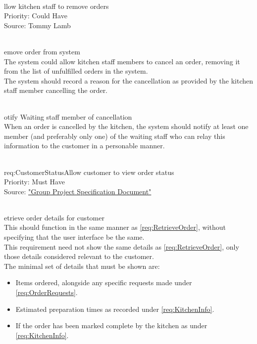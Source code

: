 \documentclass[11pt, a4paper]{report}
\def\itempar#1\\{\item \textbf{#1}\\} %
\begin{document}
\begin{enumerate}[label=F-UR-\arabic*, series=functional]
\begin{enumerate}[label*=.\arabic*]
\end{enumerate}

\itempar Allow kitchen staff to remove orders\\
Priority: Could Have\\
Source: Tommy Lamb\\
\begin{enumerate}[label*=.\arabic*]
\itempar Remove order from system\\
The system could allow kitchen staff members to cancel an order, removing it from the list of unfulfilled orders in the system.\\
The system should record a reason for the cancellation as provided by the kitchen staff member cancelling the order.

\itempar Notify Waiting staff member of cancellation\\
When an order is cancelled by the kitchen, the system should notify at least one member (and preferably only one) of the waiting staff who can relay this information to the customer in a personable manner.
\end{enumerate}

\itempar \label{req:CustomerStatus}Allow customer to view order status\\
Priority: Must Have\\
Source: \href{http://www.macs.hw.ac.uk/~rpp6/teaching/GroupProject/docs/project/GroupProjectSpec2017.pdf}{"Group Project Specification Document"}

\begin{enumerate}[label*=.\arabic*]

\itempar Retrieve order details for customer\\
This should function in the same manner as \autoref{req:RetrieveOrder}, without specifying that the user interface be the same.\\
This requirement need not show the same details as \autoref{req:RetrieveOrder}, only those details considered relevant to the customer.\\
The minimal set of details that must be shown are:
\begin{itemize}
\item Items ordered, alongside any specific requests made under \autoref{req:OrderRequests}.
\item Estimated preparation times as recorded under \autoref{req:KitchenInfo}.
\item If the order has been marked complete by the kitchen as under \autoref{req:KitchenInfo}.
\end{itemize}


\end{enumerate}
\end{enumerate}
\end{document}
